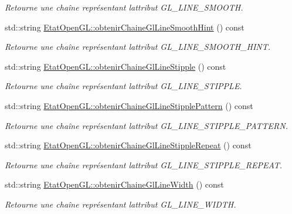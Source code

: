 \begin{DoxyCompactItemize}
\begin{DoxyCompactList}\small\item\em Retourne une chaîne représentant l\textquotesingle{}attribut G\+L\+\_\+\+L\+I\+N\+E\+\_\+\+S\+M\+O\+O\+T\+H. \end{DoxyCompactList}\item 
std\+::string \hyperlink{group__utilitaire_ga259303d6900794169347807035689bc8}{Etat\+Open\+G\+L\+::obtenir\+Chaine\+Gl\+Line\+Smooth\+Hint} () const 
\begin{DoxyCompactList}\small\item\em Retourne une chaîne représentant l\textquotesingle{}attribut G\+L\+\_\+\+L\+I\+N\+E\+\_\+\+S\+M\+O\+O\+T\+H\+\_\+\+H\+I\+N\+T. \end{DoxyCompactList}\item 
std\+::string \hyperlink{group__utilitaire_gae6a2fafc56ddcffeb516c7e7451ee620}{Etat\+Open\+G\+L\+::obtenir\+Chaine\+Gl\+Line\+Stipple} () const 
\begin{DoxyCompactList}\small\item\em Retourne une chaîne représentant l\textquotesingle{}attribut G\+L\+\_\+\+L\+I\+N\+E\+\_\+\+S\+T\+I\+P\+P\+L\+E. \end{DoxyCompactList}\item 
std\+::string \hyperlink{group__utilitaire_gaf5594a01ce0e3ce08073c9d8adc2dc7d}{Etat\+Open\+G\+L\+::obtenir\+Chaine\+Gl\+Line\+Stipple\+Pattern} () const 
\begin{DoxyCompactList}\small\item\em Retourne une chaîne représentant l\textquotesingle{}attribut G\+L\+\_\+\+L\+I\+N\+E\+\_\+\+S\+T\+I\+P\+P\+L\+E\+\_\+\+P\+A\+T\+T\+E\+R\+N. \end{DoxyCompactList}\item 
std\+::string \hyperlink{group__utilitaire_gab9b326741292e41732d5e0b646c4f006}{Etat\+Open\+G\+L\+::obtenir\+Chaine\+Gl\+Line\+Stipple\+Repeat} () const 
\begin{DoxyCompactList}\small\item\em Retourne une chaîne représentant l\textquotesingle{}attribut G\+L\+\_\+\+L\+I\+N\+E\+\_\+\+S\+T\+I\+P\+P\+L\+E\+\_\+\+R\+E\+P\+E\+A\+T. \end{DoxyCompactList}\item 
std\+::string \hyperlink{group__utilitaire_gacd329652ea9f177db0c0ad44bc9150bd}{Etat\+Open\+G\+L\+::obtenir\+Chaine\+Gl\+Line\+Width} () const 
\begin{DoxyCompactList}\small\item\em Retourne une chaîne représentant l\textquotesingle{}attribut G\+L\+\_\+\+L\+I\+N\+E\+\_\+\+W\+I\+D\+T\+H. \end{DoxyCompactList}\item 

\end{DoxyCompactItemize}
